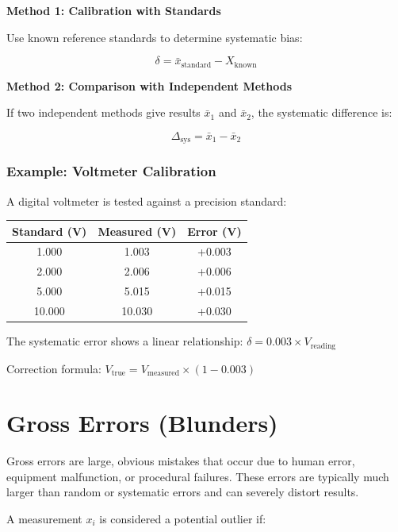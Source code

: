 \documentclass[twoside]{book}
\begin{document}
\textbf{Method 1: Calibration with Standards}

Use known reference standards to determine systematic bias:

\begin{equation}
\delta = \bar{x}_{\text{standard}} - X_{\text{known}}
\end{equation}

\textbf{Method 2: Comparison with Independent Methods}

If two independent methods give results $\bar{x}_1$ and $\bar{x}_2$, the systematic difference is:

\begin{equation}
\Delta_{\text{sys}} = \bar{x}_1 - \bar{x}_2
\end{equation}

\subsubsection{Example: Voltmeter Calibration}

A digital voltmeter is tested against a precision standard:

\begin{center}
\begin{tabular}{ccc}
\toprule
Standard (V) & Measured (V) & Error (V) \\
\midrule
1.000 & 1.003 & +0.003 \\
2.000 & 2.006 & +0.006 \\
5.000 & 5.015 & +0.015 \\
10.000 & 10.030 & +0.030 \\
\bottomrule
\end{tabular}
\end{center}

The systematic error shows a linear relationship: $\delta = 0.003 \times V_{\text{reading}}$

Correction formula: $V_{\text{true}} = V_{\text{measured}} \times (1 - 0.003)$

\section{Gross Errors (Blunders)}

Gross errors are large, obvious mistakes that occur due to human error, equipment malfunction, or procedural failures. These errors are typically much larger than random or systematic errors and can severely distort results.

A measurement $x_i$ is considered a potential outlier if:
\end{document}
